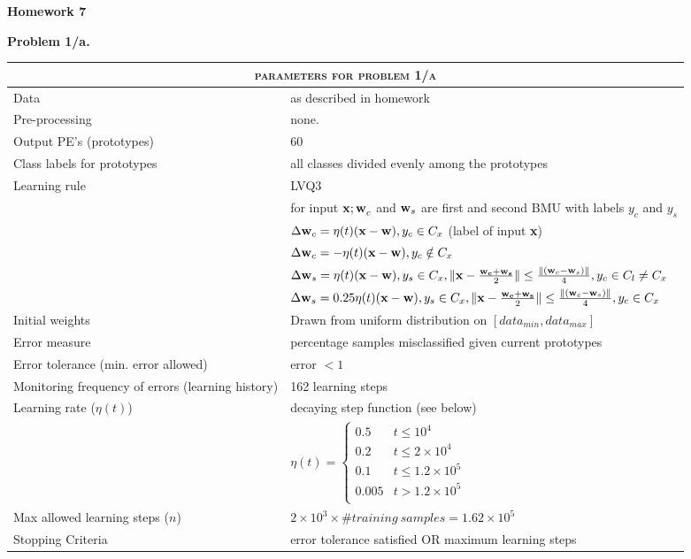 \documentclass[epsfig]{article}
\def\bpar{\vskip26pt}
\def\spar{\vskip10pt}
\begin{document}
\parindent=0pt
\null\bpar
\centerline{\bf Homework 7}
%
%
%
%
%
%
\bpar
{\bf Problem 1/a.}
\spar
%
%
%
\spar

{
\begin{tabular}{ll}
\hline
\hline
\multicolumn{2}{c}{\textsc{parameters for problem 1/a}} \\
\hline
\hline
Data			   & as described in homework \\
\hline
Pre-processing          &  none. \\
\hline
Output PE's (prototypes)		& 60 \\
\hline
Class labels for prototypes    & all classes divided evenly among the prototypes \\
\hline
Learning rule                     & LVQ3\\
  & 				for input ${\bf x; w}_c$ and ${\bf w}_s$ are first and second BMU with labels $y_c$ and $y_s$\\
& $\Delta {\bf w}_c = \eta(t)({\bf x - w}), y_c \in C_x $ (label of input {\bf x})\\
& $\Delta {\bf w}_c = -\eta(t)({\bf x - w}), y_c \notin C_x $\\
&				$\Delta {\bf w}_s = \eta(t)({\bf x - w}), y_s \in C_x,\Vert {\bf x} - \frac{\bf w_c + w_s}{2} \Vert \leq  \frac{\Vert ({\bf w}_c - {\bf w}_s)\Vert}{4}, y_c \in C_l \neq C_x $ \\
&   $\Delta {\bf w}_s = 0.25 \eta(t)({\bf x - w}), y_s \in C_x,\Vert {\bf x} - \frac{\bf w_c + w_s}{2} \Vert \leq  \frac{\Vert ({\bf w}_c - {\bf w}_s)\Vert}{4}, y_c \in  C_x $   \\
\hline
Initial weights                    & Drawn from uniform distribution on $[data_{min},data_{max}]$\\
\hline
Error measure                   &  percentage samples misclassified given current prototypes \\
\hline
Error tolerance (min. error allowed)                  & error $< 1$\\ 
\hline
Monitoring frequency of errors  (learning history) & 162 learning steps\\
\hline
Learning rate ($\eta(t)$)            & decaying step function (see below)\\
& 	     $
		\eta(t) = 
		 \begin{cases} 
     			 0.5 & t\leq 10^4\\
			 0.2 & t \leq 2 \times 10^4  \\
			 0.1 & t \leq 1.2 \times 10^5 \\
			 0.005 & t > 1.2 \times 10^5 \\
 		  \end{cases}
	    $ \\
\hline
Max allowed learning steps ($n$)   & $2 \times 10^3 \times \# training~samples = 1.62 \times 10^5$ \\
\hline
Stopping Criteria          & error tolerance satisfied OR maximum learning steps \\
\hline
\end{tabular}
}
\end{document}
